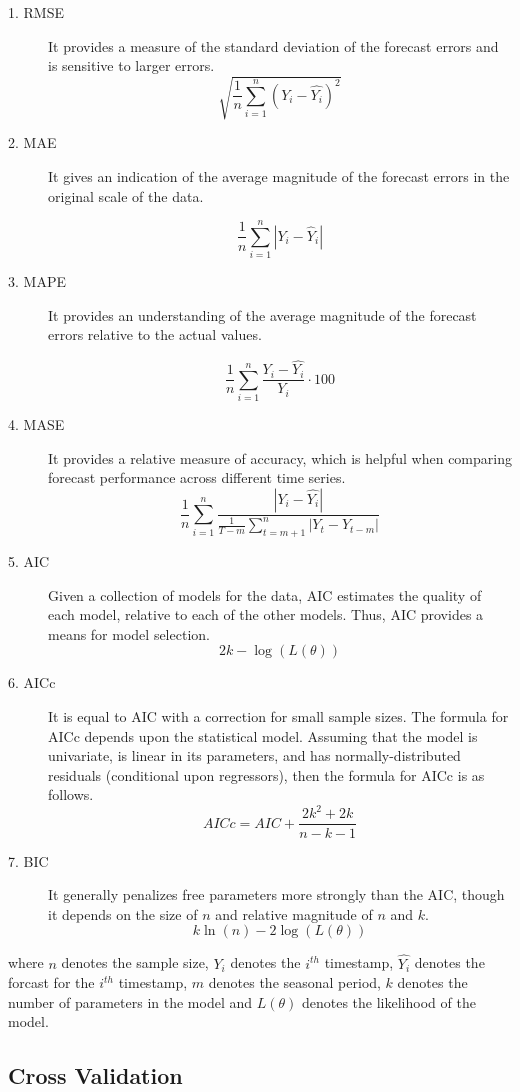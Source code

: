 \documentclass[
]{article}
\begin{document}
\begin{description}
\item[1. RMSE]
It provides a measure of the standard deviation of the forecast errors
and is sensitive to larger
errors.\[ \sqrt{\frac{1}{n} \sum_{i=1}^{n}{(Y_i - \hat{Y_i})^2}} \]
\item[2. MAE]
It gives an indication of the average magnitude of the forecast errors
in the original scale of the data.

\[ \frac{1}{n}\sum_{i=1}^{n}{|Y_i-\hat{Y}_i|} \]
\item[3. MAPE]
It provides an understanding of the average magnitude of the forecast
errors relative to the actual values.

\[ \frac{1}{n}\sum_{i=1}^{n}{\frac{Y_i-\hat{Y_i}}{Y_i}\cdot100} \]
\item[4. MASE]
It provides a relative measure of accuracy, which is helpful when
comparing forecast performance across different time
series.\[ \frac{1}{n}\sum_{i=1}^{n}{\frac{|Y_i-\hat{Y_i}|}{\frac{1}{T-m}\sum_{t=m+1}^{n}|Y_t-Y_{t-m}|}} \]
\item[5. AIC]
Given a collection of models for the data, AIC estimates the quality of
each model, relative to each of the other models. Thus, AIC provides a
means for model selection.\[ 2k-\log(L(\theta)) \]
\item[6. AICc]
It is equal to AIC with a correction for small sample sizes. The formula
for AICc depends upon the statistical model. Assuming that the model is
univariate, is linear in its parameters, and has normally-distributed
residuals (conditional upon regressors), then the formula for AICc is as
follows. \[AICc  = AIC + \frac{2k^2+2k}{n-k-1} \]
\item[7. BIC]
It generally penalizes free parameters more strongly than the AIC,
though it depends on the size of \(n\) and relative magnitude of \(n\)
and \(k\). \[k\ln(n) - 2\log(L(\theta))\]
\end{description}

where \(n\) denotes the sample size, \(Y_i\) denotes the \(i^{th}\)
timestamp, \(\hat{Y_i}\) denotes the forcast for the \(i^{th}\)
timestamp, \(m\) denotes the seasonal period, \(k\) denotes the number
of parameters in the model and \(L(\theta)\) denotes the likelihood of
the model.

\hypertarget{cross-validation}{%
\subsection{Cross Validation}\label{cross-validation}}
\end{document}
